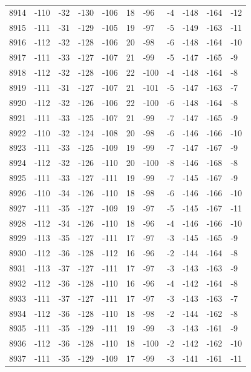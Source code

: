 \begin{table}[H]
\begin{tabular}{lllllllllll}
8914 & -110 & -32 & -130 & -106 & 18 & -96 & -4 & -148 & -164 & -12 \\
8915 & -111 & -31 & -129 & -105 & 19 & -97 & -5 & -149 & -163 & -11 \\
8916 & -112 & -32 & -128 & -106 & 20 & -98 & -6 & -148 & -164 & -10 \\
8917 & -111 & -33 & -127 & -107 & 21 & -99 & -5 & -147 & -165 & -9 \\
8918 & -112 & -32 & -128 & -106 & 22 & -100 & -4 & -148 & -164 & -8 \\
8919 & -111 & -31 & -127 & -107 & 21 & -101 & -5 & -147 & -163 & -7 \\
8920 & -112 & -32 & -126 & -106 & 22 & -100 & -6 & -148 & -164 & -8 \\
8921 & -111 & -33 & -125 & -107 & 21 & -99 & -7 & -147 & -165 & -9 \\
8922 & -110 & -32 & -124 & -108 & 20 & -98 & -6 & -146 & -166 & -10 \\
8923 & -111 & -33 & -125 & -109 & 19 & -99 & -7 & -147 & -167 & -9 \\
8924 & -112 & -32 & -126 & -110 & 20 & -100 & -8 & -146 & -168 & -8 \\
8925 & -111 & -33 & -127 & -111 & 19 & -99 & -7 & -145 & -167 & -9 \\
8926 & -110 & -34 & -126 & -110 & 18 & -98 & -6 & -146 & -166 & -10 \\
8927 & -111 & -35 & -127 & -109 & 19 & -97 & -5 & -145 & -167 & -11 \\
8928 & -112 & -34 & -126 & -110 & 18 & -96 & -4 & -146 & -166 & -10 \\
8929 & -113 & -35 & -127 & -111 & 17 & -97 & -3 & -145 & -165 & -9 \\
8930 & -112 & -36 & -128 & -112 & 16 & -96 & -2 & -144 & -164 & -8 \\
8931 & -113 & -37 & -127 & -111 & 17 & -97 & -3 & -143 & -163 & -9 \\
8932 & -112 & -36 & -128 & -110 & 16 & -96 & -4 & -142 & -164 & -8 \\
8933 & -111 & -37 & -127 & -111 & 17 & -97 & -3 & -143 & -163 & -7 \\
8934 & -112 & -36 & -128 & -110 & 18 & -98 & -2 & -144 & -162 & -8 \\
8935 & -111 & -35 & -129 & -111 & 19 & -99 & -3 & -143 & -161 & -9 \\
8936 & -112 & -36 & -128 & -110 & 18 & -100 & -2 & -142 & -162 & -10 \\
8937 & -111 & -35 & -129 & -109 & 17 & -99 & -3 & -141 & -161 & -11 \\

\end{tabular}
\end{table}
